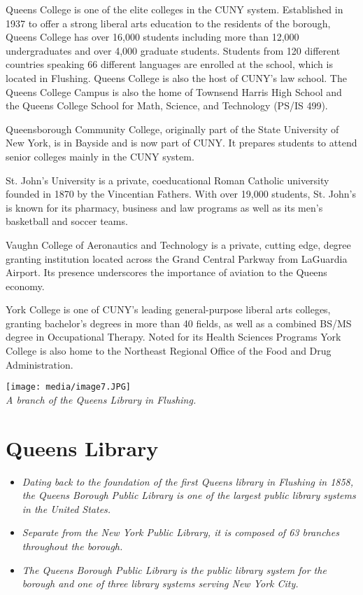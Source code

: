 Queens College is one of the elite colleges in the CUNY system.
Established in 1937 to offer a strong liberal arts education to the
residents of the borough, Queens College has over 16,000 students
including more than 12,000 undergraduates and over 4,000 graduate
students. Students from 120 different countries speaking 66 different
languages are enrolled at the school, which is located in Flushing.
Queens College is also the host of CUNY's law school. The Queens College
Campus is also the home of Townsend Harris High School and the Queens
College School for Math, Science, and Technology (PS/IS 499).

Queensborough Community College, originally part of the State University
of New York, is in Bayside and is now part of CUNY. It prepares students
to attend senior colleges mainly in the CUNY system.

St. John's University is a private, coeducational Roman Catholic
university founded in 1870 by the Vincentian Fathers. With over 19,000
students, St. John's is known for its pharmacy, business and law
programs as well as its men's basketball and soccer teams.

Vaughn College of Aeronautics and Technology is a private, cutting edge,
degree granting institution located across the Grand Central Parkway
from LaGuardia Airport. Its presence underscores the importance of
aviation to the Queens economy.

York College is one of CUNY's leading general-purpose liberal arts
colleges, granting bachelor's degrees in more than 40 fields, as well as
a combined BS/MS degree in Occupational Therapy. Noted for its Health
Sciences Programs York College is also home to the Northeast Regional
Office of the Food and Drug Administration.

\texttt{[image: media/image7.JPG]}\\
\emph{A branch of the Queens Library in Flushing.}

\section{Queens Library}\label{queens-library}

\begin{itemize}
\item
  \emph{Dating back to the foundation of the first Queens library in
  Flushing in 1858, the Queens Borough Public Library is one of the
  largest public library systems in the United States.}
\item
  \emph{Separate from the New York Public Library, it is composed of 63
  branches throughout the borough.}
\item
  \emph{The Queens Borough Public Library is the public library system
  for the borough and one of three library systems serving New York
  City.}
\end{itemize}

